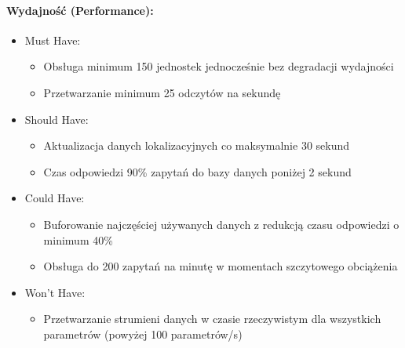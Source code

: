 \documentclass[12pt,a4paper,polish]{article}
\begin{document}
\paragraph{Wydajność (Performance):}
\begin{itemize}
	\item Must Have:
	      \begin{itemize}
		      \item Obsługa minimum 150 jednostek jednocześnie bez degradacji wydajności
		      \item Przetwarzanie minimum 25 odczytów na sekundę
	      \end{itemize}
	\item Should Have:
	      \begin{itemize}
		      \item Aktualizacja danych lokalizacyjnych co maksymalnie 30 sekund
		      \item Czas odpowiedzi 90\% zapytań do bazy danych poniżej 2 sekund
	      \end{itemize}
	\item Could Have:
	      \begin{itemize}
		      \item Buforowanie najczęściej używanych danych z redukcją czasu odpowiedzi o minimum 40\%
		      \item Obsługa do 200 zapytań na minutę w momentach szczytowego obciążenia
	      \end{itemize}
	\item Won't Have:
	      \begin{itemize}
		      \item Przetwarzanie strumieni danych w czasie rzeczywistym dla wszystkich parametrów (powyżej 100 parametrów/s)
	      \end{itemize}
\end{itemize}
\end{document}
